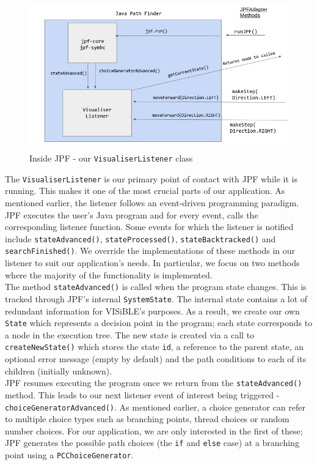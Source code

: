 \documentclass[titlepage,11pt]{article}
\begin{document}
\begin{figure}
\centering
\includegraphics[scale=0.6]{inside_jpf.png}
\caption{Inside JPF - our \texttt{VisualiserListener} class}
\end{figure}

The \texttt{VisualiserListener} is our primary point of contact with JPF while it is running. This makes it one of the most crucial parts of our application. As mentioned earlier, the listener follows an event-driven programming paradigm. JPF executes the user's Java program and for every event, calls the corresponding listener function. Some events for which the listener is notified include \texttt{stateAdvanced()}, \texttt{stateProcessed()}, \texttt{stateBacktracked()} and \texttt{searchFinished()}. We override the implementations of these methods in our listener to suit our application's needs. In particular, we focus on two methods where the majority of the functionality is implemented. \\

The method \texttt{stateAdvanced()} is called when the program state changes. This is tracked through JPF's internal \texttt{SystemState}. The internal state contains a lot of redundant information for VISiBLE's purposes. As a result, we create our own \texttt{State} which represents a decision point in the program; each state corresponds to a node in the execution tree. The new state is created via a call to \texttt{createNewState()} which stores the state \texttt{id}, a reference to the parent state, an optional error message (empty by default) and the path conditions to each of its children (initially unknown). \\

JPF resumes executing the program once we return from the \texttt{stateAdvanced()} method. This leads to our next listener event of interest being triggered - \texttt{choiceGeneratorAdvanced()}. As mentioned earlier, a choice generator can refer to multiple choice types such as branching points, thread choices or random number choices. For our application, we are only interested in the first of these; JPF generates the possible path choices (the \texttt{if} and \texttt{else} case) at a branching point using a \texttt{PCChoiceGenerator}. \\
\end{document}
